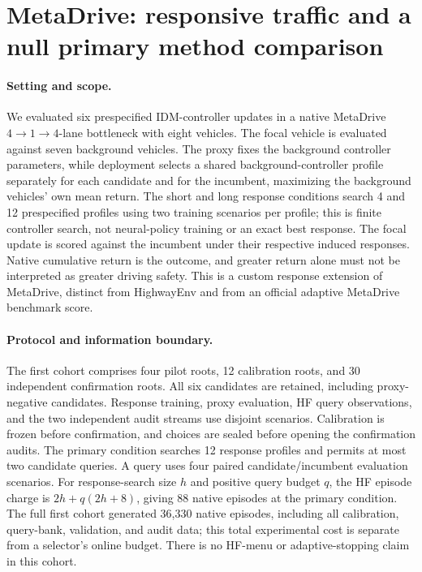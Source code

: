\section{MetaDrive: responsive traffic and a null primary method comparison}
\label{add20260923:metadrive:section}

\paragraph{Setting and scope.}
We evaluated six prespecified IDM-controller updates in a native MetaDrive
$4\!\rightarrow\!1\!\rightarrow\!4$-lane bottleneck with eight vehicles.
The focal vehicle is evaluated against seven background vehicles.
The proxy fixes the background controller parameters, while deployment selects
a shared background-controller profile separately for each candidate and for
the incumbent, maximizing the background vehicles' own mean return.
The short and long response conditions search 4 and 12 prespecified profiles
using two training scenarios per profile; this is finite controller search,
not neural-policy training or an exact best response.
The focal update is scored against the incumbent under their respective
induced responses. Native cumulative return is the outcome, and greater return
alone must not be interpreted as greater driving safety.
This is a custom response extension of MetaDrive, distinct from HighwayEnv
and from an official adaptive MetaDrive benchmark score.

\paragraph{Protocol and information boundary.}
The first cohort comprises four pilot roots, 12 calibration roots, and
30 independent confirmation roots. All six candidates are retained, including
proxy-negative candidates. Response training, proxy evaluation, HF query
observations, and the two independent audit streams use disjoint scenarios.
Calibration is frozen before confirmation, and choices are sealed before
opening the confirmation audits. The primary condition searches 12 response
profiles and permits at most two candidate queries. A query uses four paired
candidate/incumbent evaluation scenarios. For response-search size $h$ and
positive query budget $q$, the HF episode charge is
$2h+q(2h+8)$, giving 88 native episodes at the primary condition.
The full first cohort generated 36,330 native episodes, including all
calibration, query-bank, validation, and audit data; this total experimental
cost is separate from a selector's online budget. There is no HF-menu or
adaptive-stopping claim in this cohort.

